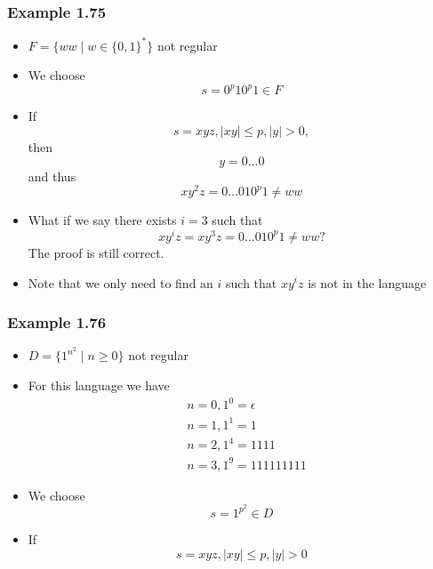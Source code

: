 \begin{frame}[allowframebreaks] \frametitle{Example 1.75}
  \begin{itemize}
\item $F=\{ww\mid w \in \{0,1\}^*\}$ not regular
\item We choose
  \begin{equation*}
s=0^p 1 0^p 1 \in F
\end{equation*}
\item If
  \begin{equation*}
    s =xyz,
    |xy|
\leq p, |y|>0,
\end{equation*}
then
\begin{equation*}
 y = 0\ldots 0
\end{equation*}
and thus
\begin{equation*}
xy^2z = 0 \ldots 0 1 0^p 1\neq ww
\end{equation*}
\item What if we say there exists $i = 3$ such that
  \begin{equation*}
xy^iz = xy^3z = 0 \ldots 0 1 0^p 1\neq ww?
\end{equation*}
The proof is still correct. 
\item Note that we only need to \alert{find an $i$}
such that $xy^iz$ is not in the language
\end{itemize}\end{frame} \begin{frame}[allowframebreaks] \frametitle{Example 1.76}
  \begin{itemize}
\item $D=\{1^{n^2}
\mid n \geq 0\}$ not regular
\item For this language we have
  \begin{equation*}
    \begin{split}
      & n = 0, 1^0 = \epsilon\\
      & n = 1, 1^1 = 1\\
      & n = 2, 1^4 = 1111\\
      & n = 3, 1^9 = 111111111
    \end{split}
  \end{equation*}
\item We choose
  \begin{equation*}
  s=1^{p^2} \in D
\end{equation*}
\item If 
  \begin{equation*}
s =xyz, |xy |\leq p, |y|>0
\end{equation*}

\end{itemize}
\end{frame}
